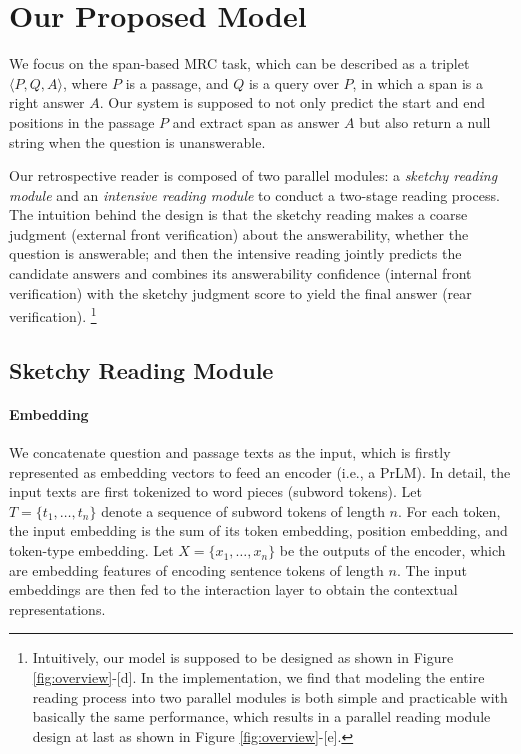 \documentclass[letterpaper]{article} %
\begin{document}
\section{Our Proposed Model}
We focus on the span-based MRC task, which can be described as a triplet $\langle P, Q, A \rangle$, where $P$ is a passage, and $Q$ is a query over $P$, in which a span is a right answer $A$. Our system is supposed to not only predict the start and end positions in the passage $P$ and extract span as answer $A$ but also return a null string when the question is unanswerable. 

Our retrospective reader is composed of two parallel modules: a \textit{sketchy reading module} and an \textit{intensive reading module} to conduct a two-stage reading process. The intuition behind the design is that the sketchy reading makes a coarse judgment (external front verification) about the answerability, whether the question is answerable; and then the intensive reading jointly predicts the candidate answers and combines its answerability confidence (internal front verification) with the sketchy judgment score to yield the final answer (rear verification). 
\footnote{Intuitively, our model is supposed to be designed as shown in Figure \ref{fig:overview}-[d]. In the implementation, we find that modeling the entire reading process into two parallel modules is both simple and practicable with basically the same performance, which results in a parallel reading module design at last as shown in Figure \ref{fig:overview}-[e].}

\subsection{Sketchy Reading Module}
\paragraph{Embedding}
We concatenate question and passage texts as the input, which is firstly represented as embedding vectors to feed an encoder (i.e., a PrLM). In detail, 
the input texts are first tokenized to word pieces (subword tokens). Let $T=\{t_1,\dots,t_n\}$ denote a sequence of subword tokens of length $n$. 
For each token, the input embedding is the sum of its token embedding, position embedding, and token-type embedding. 
Let $X = \{x_1, \dots, x_n\}$ be the outputs of the encoder, which are embedding features of encoding sentence tokens of length $n$. The input embeddings are then fed to the interaction layer to obtain the contextual representations.
\end{document}
